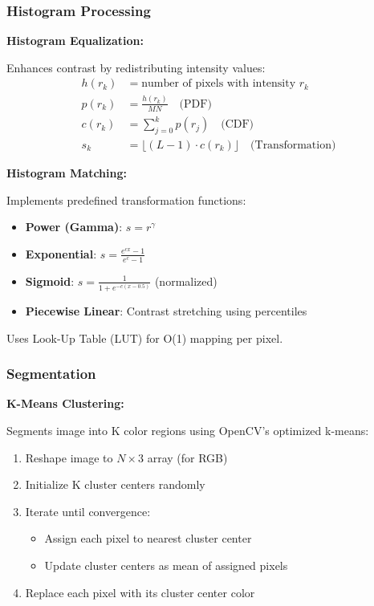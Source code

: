 \documentclass[12pt,a4paper]{article}
\begin{document}
\subsubsection{Histogram Processing}

\textbf{Histogram Equalization:}

Enhances contrast by redistributing intensity values:
\begin{align}
h(r_k) &= \text{number of pixels with intensity } r_k \\
p(r_k) &= \frac{h(r_k)}{MN} \quad \text{(PDF)} \\
c(r_k) &= \sum_{j=0}^{k} p(r_j) \quad \text{(CDF)} \\
s_k &= \lfloor(L-1) \cdot c(r_k)\rfloor \quad \text{(Transformation)}
\end{align}

\textbf{Histogram Matching:}

Implements predefined transformation functions:
\begin{itemize}
    \item \textbf{Power (Gamma)}: $s = r^\gamma$
    \item \textbf{Exponential}: $s = \frac{e^{cx} - 1}{e^c - 1}$
    \item \textbf{Sigmoid}: $s = \frac{1}{1 + e^{-c(x-0.5)}}$ (normalized)
    \item \textbf{Piecewise Linear}: Contrast stretching using percentiles
\end{itemize}

Uses Look-Up Table (LUT) for O(1) mapping per pixel.

\subsubsection{Segmentation}

\textbf{K-Means Clustering:}

Segments image into K color regions using OpenCV's optimized k-means:
\begin{enumerate}
    \item Reshape image to $N \times 3$ array (for RGB)
    \item Initialize K cluster centers randomly
    \item Iterate until convergence:
    \begin{itemize}
        \item Assign each pixel to nearest cluster center
        \item Update cluster centers as mean of assigned pixels
    \end{itemize}
    \item Replace each pixel with its cluster center color
\end{enumerate}
\end{document}
